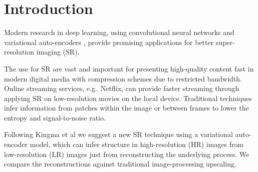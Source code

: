 \section{Introduction}
\label{sec:introduction}
Modern research in deep learning, using convolutional neural networks \cite{Dong15} and variational auto-encoders \cite{Kingma2013, Johnson16}, provide promising applications for better super-resolution imaging (SR).  

The use for SR are vast and important for presenting high-quality content fast in modern digital media with compression schemes due to restricted bandwidth. Online streaming services, e.g.\ Netflix, can provide faster streaming through applying SR on low-resolution movies on the local device. Traditional techniques infer information from patches within the image or between frames to lower the entropy and signal-to-noise ratio. 

Following Kingma et al \cite{Kingma2013} we suggest a new SR technique using a variational auto-encoder model, which can infer structure in high-resolution (HR) images from low-resolution (LR) images just from reconstructing the underlying process. We compare the reconstructions against traditional image-processing upscaling.

